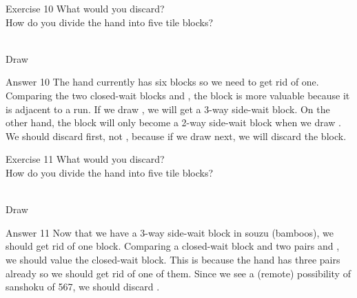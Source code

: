 \vfill

\begin{itembox}[l]{Exercise 10}
What would you discard? \\
\vsp
How do you divide the hand into five tile blocks?

\bp
{}\bei\bei~\\
\hfill\footnotesize{Draw~~~~~~~~~~~}
\ep
\end{itembox}

\newpage


\begin{itembox}[r]{Answer 10}
\emj
The hand currently has six blocks so we need to get rid of one. Comparing the two closed-wait blocks {\LARGE{}} and {\LARGE{}}, the {\LARGE{}} block is more valuable because it is adjacent to a run. If we draw {\LARGE{}}, we will get a 3-way side-wait block. On the other hand, the {\LARGE{}} block will only become a 2-way side-wait block when we draw {\LARGE{}}. We should discard {\LARGE{}} first, not {\LARGE{}}, because if we draw {\LARGE{}} next, we will discard the {\LARGE{}} block.
\end{itembox}

\vfill

\begin{itembox}[l]{Exercise 11}
What would you discard? \\
\vsp
How do you divide the hand into five tile blocks?

\bp
{}~\\
\hfill\footnotesize{Draw~~~~~~~~~~~}
\ep
\end{itembox}

\newpage


\begin{itembox}[r]{Answer 11}
\emj
Now that we have a 3-way side-wait block in {\jap souzu} (bamboos), we should get rid of one block. Comparing a closed-wait block {\LARGE{}} and two pairs {\LARGE{}} and {\LARGE{}}, we should value the closed-wait block. This is because the hand has three pairs already so we should get rid of one of them. Since we see a (remote) possibility of {\jap sanshoku} of 567, we should discard {\LARGE{}}.
\end{itembox}


